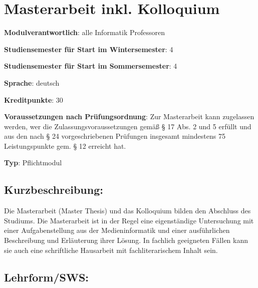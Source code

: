 \chapter{Masterarbeit inkl.
Kolloquium\label{/mi-2017/modulbeschreibungen-master/MA_All_Modul_Masterarbeit}}\label{masterarbeit-inkl.-kolloquiumpathlabelmi-2017modulbeschreibungen-mastermaux5fallux5fmodulux5fmasterarbeit}

\begin{modulHead}
\textbf{Modulverantwortlich}: alle Informatik
Professoren
\end{modulHead}
\begin{modulHead}
\textbf{Studiensemester
für Start im Wintersemester}:
4
\end{modulHead}
\begin{modulHead}
\textbf{Studiensemester für Start
im Sommersemester}:
4
\end{modulHead}
\begin{modulHead}
\textbf{Sprache}:
deutsch
\end{modulHead}
\begin{modulHead}
\textbf{Kreditpunkte}:
30
\end{modulHead}
\begin{modulHead}
\textbf{Voraussetzungen nach
Prüfungsordnung}: Zur Masterarbeit kann zugelassen werden, wer die
Zulassungsvoraussetzungen gemäß § 17 Abs. 2 und 5 erfüllt und aus den
nach § 24 vorgeschriebenen Prüfungen insgesamt mindestens 75
Leistungspunkte gem. § 12 erreicht
hat.
\end{modulHead}
\begin{modulHead}
\textbf{Typ}:
Pflichtmodul
\end{modulHead}


\section*{Kurzbeschreibung:\label{/mi-2017/modulbeschreibungen-master/MA_All_Modul_Masterarbeit}}\label{kurzbeschreibungpathlabelmi-2017modulbeschreibungen-mastermaux5fallux5fmodulux5fmasterarbeit}

Die Masterarbeit (Master Thesis) und das Kolloquium bilden den Abschluss
des Studiums. Die Masterarbeit ist in der Regel eine eigenständige
Untersuchung mit einer Aufgabenstellung aus der Medieninformatik und
einer ausführlichen Beschreibung und Erläuterung ihrer Lösung. In
fachlich geeigneten Fällen kann sie auch eine schriftliche Hausarbeit
mit fachliterarischem Inhalt sein.

\section*{Lehrform/SWS:\label{/mi-2017/modulbeschreibungen-master/MA_All_Modul_Masterarbeit}}\label{lehrformswspathlabelmi-2017modulbeschreibungen-mastermaux5fallux5fmodulux5fmasterarbeit}


